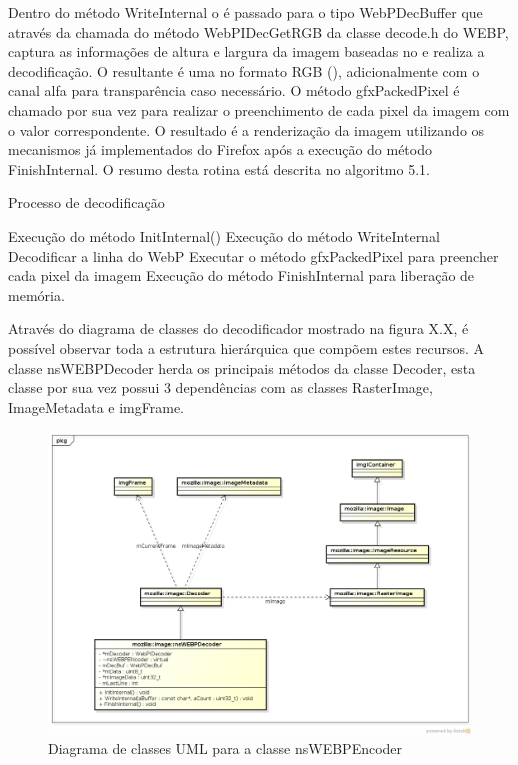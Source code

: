 \documentclass[espaco=simples,appendix=Name]{abnt}
\begin{document}
Dentro do método WriteInternal o  é passado para o tipo WebPDecBuffer que através da chamada do método WebPIDecGetRGB da classe decode.h do WEBP, captura as informações de altura e largura da imagem baseadas no  e realiza a decodificação. O  resultante é uma  no formato RGB (), adicionalmente com o canal alfa para transparência caso necessário. O método gfxPackedPixel é chamado por sua vez para realizar o preenchimento de cada pixel da imagem com o valor correspondente. O resultado é a renderização da imagem utilizando os mecanismos já implementados do Firefox após a execução do método FinishInternal. O resumo desta rotina está descrita no algoritmo 5.1.

\begin{algorithm}[H]
\caption{Processo de decodificação}
\label{Decodificacao}
\begin{algorithmic}
	\STATE Execução do método InitInternal()
	\STATE Execução do método WriteInternal
	\STATE Decodificar a linha do  WebP
	\STATE Executar o método gfxPackedPixel para preencher cada pixel da imagem
	\ENDFOR
	\STATE Execução do método FinishInternal para liberação de memória.
\end{algorithmic}
\end{algorithm}

Através do diagrama de classes do decodificador mostrado na figura X.X, é possível observar toda a estrutura hierárquica que compõem estes recursos. A classe nsWEBPDecoder herda os principais métodos da classe Decoder, esta classe por sua vez possui 3 dependências com as classes RasterImage, ImageMetadata e imgFrame.

\begin{figure}[h]
  \centering
    \includegraphics[scale=0.4]{nsWEBPDecoder_UML.png}
  \caption{Diagrama de classes UML para a classe nsWEBPEncoder}
\end{figure}
\end{document}
